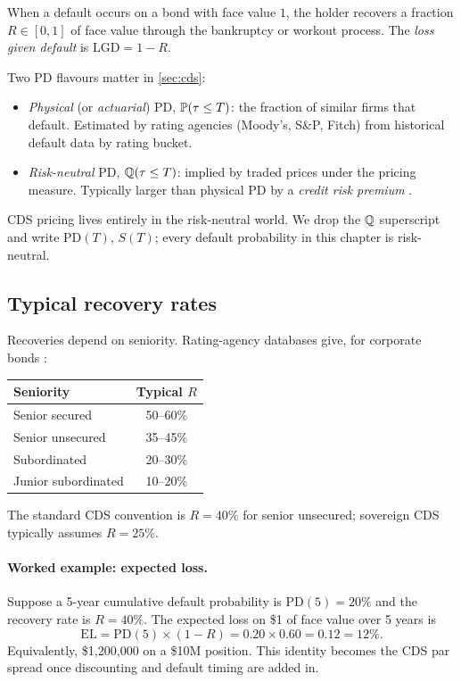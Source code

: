 \begin{definition}
When a default occurs on a bond with face value $1$, the holder
recovers a fraction $R \in [0,1]$ of face value through the
bankruptcy or workout process.  The \emph{loss given default} is
$\mathrm{LGD} = 1 - R$.
\end{definition}

Two PD flavours matter in \cref{sec:cds}:

\begin{itemize}
  \item \emph{Physical} (or \emph{actuarial}) PD,
    $\mathbb{P}(\tau \le T)$: the fraction of similar firms that
    default.  Estimated by rating agencies (Moody's, S\&P, Fitch)
    from historical default data by rating bucket.
  \item \emph{Risk-neutral} PD, $\mathbb{Q}(\tau \le T)$: implied by
    traded prices under the pricing measure.  Typically larger than
    physical PD by a \emph{credit risk premium} \citeHull.
\end{itemize}

CDS pricing lives entirely in the risk-neutral world.  We drop the
$\mathbb{Q}$ superscript and write $\mathrm{PD}(T)$, $S(T)$; every default
probability in this chapter is risk-neutral.

\subsection*{Typical recovery rates}

Recoveries depend on seniority.  Rating-agency databases give, for
corporate bonds \citeHull:

\begin{center}
\begin{tabular}{@{}lc@{}}
\toprule
\textbf{Seniority} & \textbf{Typical $R$} \\
\midrule
Senior secured           & 50--60\% \\
Senior unsecured         & 35--45\% \\
Subordinated             & 20--30\% \\
Junior subordinated      & 10--20\% \\
\bottomrule
\end{tabular}
\end{center}

The standard CDS convention is $R = 40\%$ for senior unsecured;
sovereign CDS typically assumes $R = 25\%$.

\paragraph{Worked example: expected loss.}
Suppose a 5-year cumulative default probability is
$\mathrm{PD}(5) = 20\%$ and the recovery rate is $R = 40\%$.  The
expected loss on \$1 of face value over 5 years is
\[
  \mathrm{EL}
  = \mathrm{PD}(5) \times (1 - R)
  = 0.20 \times 0.60
  = 0.12
  = 12\%.
\]
Equivalently, \$1{,}200{,}000 on a \$10M position.  This identity
becomes the CDS par spread once discounting and default timing are
added in.

